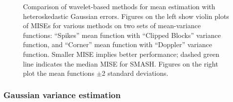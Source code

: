 \documentclass[12pt]{article}
\begin{document}
\begin{figure}
\begin{subfigure}[b]{0.65\textwidth}
        \caption{}
        \label{fig:gaus_hetero_2}
    \end{subfigure}
		\hfill
    \begin{subfigure}[b]{0.3\textwidth}
        \centering
        \caption{}
        \label{fig:gaus_hetero_sd_2}
    \end{subfigure}
    \caption{Comparison of wavelet-based methods for mean estimation with heteroskedastic Gaussian errors. Figures on the left show violin plots of MISEs for various methods on two sets of mean-variance functions: ``Spikes'' mean function with ``Clipped Blocks'' variance function, and ``Corner'' mean function with ``Doppler'' variance function. Smaller MISE implies better performance; dashed green line indicates the median MISE for SMASH. Figures on the right plot the mean functions $\pm$2 standard deviations.}
    \label{fig:gaus_hetero}
\end{figure}


\subsubsection{Gaussian variance estimation}\label{sec:mfvb}
\end{document}
